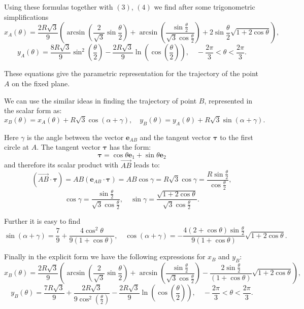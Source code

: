 \documentclass[10pt]{enoc2011}
\renewcommand{\vec}[1]{\boldsymbol{#1}}
\begin{document}
Using these formulas together with $(3)$, $(4)$ we find after some trigonometric simplifications
$$
x_A\left(\theta\right)\!=\!\frac{2R\sqrt{3}}{9}\left(\arcsin\left(\frac{2}{\sqrt{3}}\sin\frac{\theta}{2}\right)\!+\!
\arcsin\left(\frac{\sin\frac{\theta}{2}}{\sqrt{3}\cos\frac{\theta}{2}}\right)\!+\!
2\sin\frac{\theta}{2}\sqrt{1\!+\!2\cos\theta}\right),
$$
$$
y_A\left(\theta\right)=\frac{8R\sqrt{3}}{9}\sin^2\left(\frac{\theta}{2}\right)-\frac{2R\sqrt{3}}{9}\ln\left(\cos\left(\frac{\theta}{2}\right)\right),
\quad -\frac{2\pi}{3}<\theta<\frac{2\pi}{3}.
$$

These equations give the parametric representation for the trajectory of the point $A$ on the fixed plane.

We can use the similar ideas in finding  the trajectory of point $B$, 
represented in the scalar form as:
$$
x_B\left(\theta\right)=x_A\left(\theta\right)+R\sqrt{3}\cos\left(\alpha+\gamma\right),\quad
y_B\left(\theta\right)=y_A\left(\theta\right)+R\sqrt{3}\sin\left(\alpha+\gamma\right).
$$

Here $\gamma$ is the angle between the vector $\vec e_{AB}$ and the tangent vector $\vec\tau$ to the first circle at $A$. The tangent vector $\vec\tau$ has the form:
$$
\vec\tau=\cos\theta\vec e_1+\sin\theta\vec e_2
$$
and therefore its scalar product with $\overrightarrow{AB}$ leads to:
$$
\left(\overrightarrow{AB}\cdot\vec\tau\right)=AB\left(\vec e_{AB}\cdot\vec\tau\right)=AB\cos\gamma=
R\sqrt{3}\cos\gamma=\frac{R\sin\frac{\theta}{2}}{\cos\frac{\theta}{2}},
$$
$$
\cos\gamma=\frac{\sin\frac{\theta}{2}}{\sqrt{3}\cos\frac{\theta}{2}},\quad
\sin\gamma=\frac{\sqrt{1+2\cos\theta}}{\sqrt{3}\cos\frac{\theta}{2}}.
$$

Further it is easy to find
$$
\sin\left(\alpha+\gamma\right)=\frac{7}{9}+\frac{4\cos^2\theta}{9\left(1+\cos\theta\right)},\quad
\cos\left(\alpha+\gamma\right)=-\frac{4\left(2+\cos\theta\right)\sin\frac{\theta}{2}}{9\left(1+\cos\theta\right)}
\sqrt{1+2\cos\theta}.
$$

Finally in the explicit form we have the following expressions for $x_B$ and $y_B$:
$$
x_B\left(\theta\right)\!=\!\frac{2R\sqrt{3}}{9}\left(\arcsin\left(\frac{2}{\sqrt{3}}\sin\frac{\theta}{2}\right)\!+\!
\arcsin\left(\frac{\sin\frac{\theta}{2}}{\sqrt{3}\cos\frac{\theta}{2}}\right)\!-\!
\frac{2\sin\frac{\theta}{2}}{\left(1\!+\!\cos\theta\right)}\sqrt{1\!+\!2\cos\theta}\right),
$$
$$
y_B\left(\theta\right)=\frac{7R\sqrt{3}}{9}+\frac{2R\sqrt{3}}{9\cos^2\left(\frac{\theta}{2}\right)}-\frac{2R\sqrt{3}}{9}\ln\left(\cos\left(\frac{\theta}{2}\right)\right),
\quad -\frac{2\pi}{3}<\theta<\frac{2\pi}{3}.
$$
\end{document}
